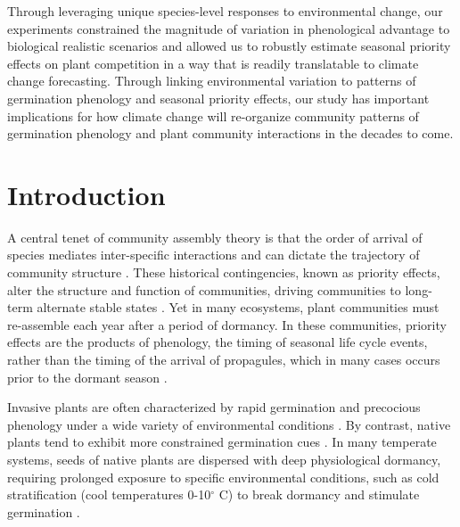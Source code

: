 \documentclass{article}[11pt]
\begin{document}
Through leveraging unique species-level responses to environmental change, our experiments constrained the magnitude of variation in phenological advantage to biological realistic scenarios and allowed us to robustly estimate seasonal priority effects on plant competition in a way that is readily translatable to climate change forecasting. Through linking environmental variation to patterns of germination phenology and seasonal priority effects, our study has important implications for how climate change will re-organize community patterns of germination phenology and plant community interactions in the decades to come.

\section*{Introduction}
 A central tenet of community assembly theory is that the order of arrival of species mediates inter-specific interactions and can dictate the trajectory of community structure \citep{Fukami2015}. These historical contingencies, known as priority effects, alter the structure and function of communities, driving communities to long-term alternate stable states \citep{Fukami2011}. Yet in many ecosystems, plant communities must re-assemble each year after a period of dormancy. In these communities, priority effects are the products of phenology, the timing of seasonal life cycle events, %
rather than the timing of the arrival of propagules, which in many cases occurs prior to the dormant season \citep{Rudolf:2019aa,Howe:1982aa,Baskin:1988aa}. 

Invasive plants are often characterized by rapid germination and precocious phenology under a wide variety of environmental conditions \citep{Gioria2018,Gioria:2017wo,Wolkovich:2011uh,Smith:2013uj}. By contrast, native plants tend to exhibit more constrained germination cues \citep{Marushia:2010ug,Wainwright:2013tv,Van-Clef:2001to}. In many temperate systems, seeds of native plants are dispersed with deep physiological dormancy, requiring prolonged exposure to specific environmental conditions, such as cold stratification (cool temperatures 0-10$^{\circ}$ C) to break dormancy and stimulate germination \citep{Brink:2013wr,Cavieres:2017aa,Bradford:2007tj}.
\end{document}
